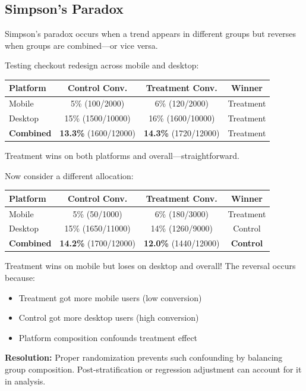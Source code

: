 \subsection{Simpson's Paradox}

Simpson's paradox occurs when a trend appears in different groups but reverses when groups are combined—or vice versa.

\begin{example}
Testing checkout redesign across mobile and desktop:

\begin{table}[h]
\centering
\begin{tabular}{lccc}
\hline
\textbf{Platform} & \textbf{Control Conv.} & \textbf{Treatment Conv.} & \textbf{Winner} \\
\hline
Mobile & 5\% (100/2000) & 6\% (120/2000) & Treatment \\
Desktop & 15\% (1500/10000) & 16\% (1600/10000) & Treatment \\
\textbf{Combined} & \textbf{13.3\%} (1600/12000) & \textbf{14.3\%} (1720/12000) & Treatment \\
\hline
\end{tabular}
\end{table}

Treatment wins on both platforms and overall—straightforward.

Now consider a different allocation:

\begin{table}[h]
\centering
\begin{tabular}{lccc}
\hline
\textbf{Platform} & \textbf{Control Conv.} & \textbf{Treatment Conv.} & \textbf{Winner} \\
\hline
Mobile & 5\% (50/1000) & 6\% (180/3000) & Treatment \\
Desktop & 15\% (1650/11000) & 14\% (1260/9000) & Control \\
\textbf{Combined} & \textbf{14.2\%} (1700/12000) & \textbf{12.0\%} (1440/12000) & \textbf{Control} \\
\hline
\end{tabular}
\end{table}

Treatment wins on mobile but loses on desktop and overall! The reversal occurs because:
\begin{itemize}
    \item Treatment got more mobile users (low conversion)
    \item Control got more desktop users (high conversion)
    \item Platform composition confounds treatment effect
\end{itemize}

\textbf{Resolution:} Proper randomization prevents such confounding by balancing group composition. Post-stratification or regression adjustment can account for it in analysis.
\end{example}


